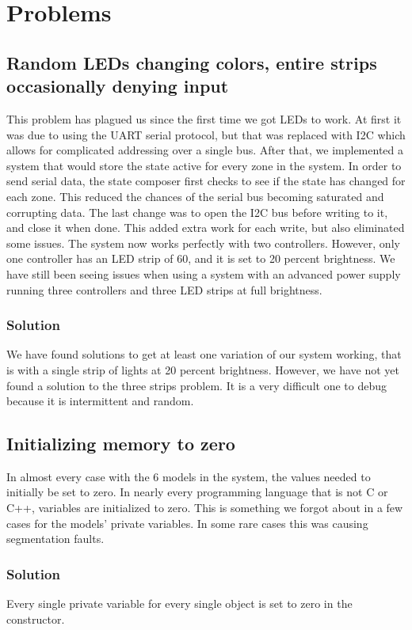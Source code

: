 \documentclass[onecolumn, draftclsnofoot,10pt, compsoc]{IEEEtran}
\begin{document}
	\section{Problems}
		\subsection{Random LEDs changing colors, entire strips occasionally denying input}
			This problem has plagued us since the first time we got LEDs to work.
			At first it was due to using the UART serial protocol, but that was replaced with I2C which allows for complicated addressing over a single bus.
			After that, we implemented a system that would store the state active for every zone in the system.
			In order to send serial data, the state composer first checks to see if the state has changed for each zone.
			This reduced the chances of the serial bus becoming saturated and corrupting data.
			The last change was to open the I2C bus before writing to it, and close it when done. This added extra work for each write, but also eliminated some issues.
			The system now works perfectly with two controllers. However, only one controller has an LED strip of 60, and it is set to 20 percent brightness.
			We have still been seeing issues when using a system with an advanced power supply running three controllers and three LED strips at full brightness.
			
			\subsubsection{Solution}
				We have found solutions to get at least one variation of our system working, that is with a single strip of lights at 20 percent brightness.
				However, we have not yet found a solution to the three strips problem. It is a very difficult one to debug because it is intermittent and random.
		
		\subsection{Initializing memory to zero}
			In almost every case with the 6 models in the system, the values needed to initially be set to zero.
			In nearly every programming language that is not C or C++, variables are initialized to zero.
			This is something we forgot about in a few cases for the models' private variables.
			In some rare cases this was causing segmentation faults.
			
			\subsubsection{Solution}
				Every single private variable for every single object is set to zero in the constructor.
\end{document}
